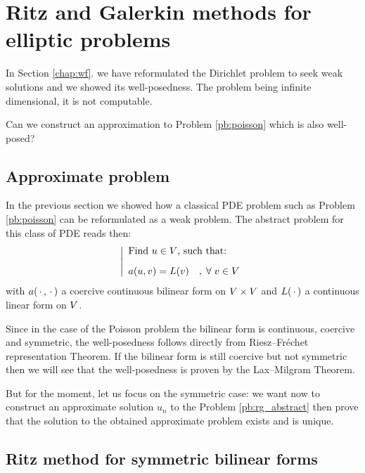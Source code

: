 
\chapter[Ritz and Galerkin for elliptic problems]{Ritz and Galerkin methods for elliptic problems}\label{chap:rg}

In Section \ref{chap:wf}. we have reformulated the Dirichlet problem to seek weak solutions and we showed its well-posedness. The problem being infinite dimensional, it is not computable.

\medskip
\Question Can we construct an approximation to Problem \eqref{pb:poisson} which is also well-posed?

\section{Approximate problem}

In the previous section we showed how a classical PDE problem such as Problem \eqref{pb:poisson} can be reformulated as a weak problem.
The abstract problem for this class of PDE reads then:
\begin{equation}\label{pb:rg_abstract}
\left\lvert
\begin{array}{ll}
\mbox{Find $u \in {V}$, such that:}\\[2ex]
\displaystyle a( u, v ) = L(v)\quad,\;{\forall\;}  v\in {V}
\end{array}
\right .
\end{equation}
with $a(\,{\mathbf\cdot}\,,\,{\mathbf\cdot}\,)$ a coercive continuous bilinear form on ${V}\times{V}$ and $L(\,{\mathbf\cdot}\,)$ a continuous linear form on ${V}$.

\medskip
Since in the case of the Poisson problem the bilinear form is continuous, coercive and symmetric, the well-posedness follows directly from Riesz--Fréchet representation Theorem. If the bilinear form is still coercive but not symmetric then we will see that the well-posedness is proven by the Lax--Milgram Theorem.

But for the moment, let us focus on the symmetric case: we want now to construct an approximate solution $u_n$ to the Problem \eqref{pb:rg_abstract} then prove that the solution to the obtained approximate problem exists and is unique.

\section{Ritz method for symmetric bilinear forms}

